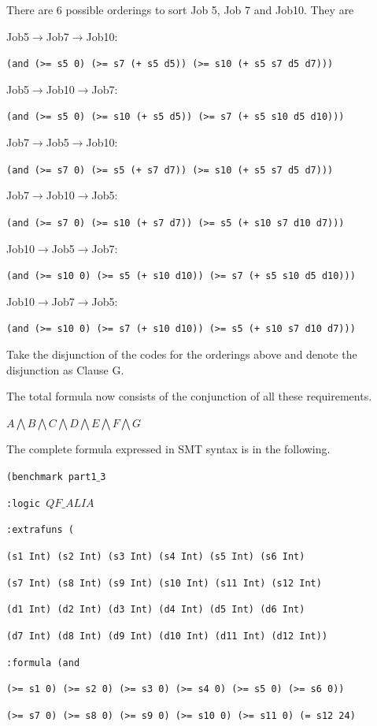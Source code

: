 \documentclass[11pt]{article}
\begin{document}
\begin{description}
  There are 6 possible orderings to sort Job 5, Job 7 and Job10. They are

  Job5$\rightarrow$Job7$\rightarrow$Job10:

  {\tt (and (>= s5 0) (>= s7 (+ s5 d5)) (>= s10 (+ s5 s7 d5 d7)))}

  Job5$\rightarrow$Job10$\rightarrow$Job7:

  {\tt (and (>= s5 0) (>= s10 (+ s5 d5)) (>= s7 (+ s5 s10 d5 d10)))}

  Job7$\rightarrow$Job5$\rightarrow$Job10:

  {\tt (and (>= s7 0) (>= s5 (+ s7 d7)) (>= s10 (+ s5 s7 d5 d7)))}

  Job7$\rightarrow$Job10$\rightarrow$Job5:

  {\tt (and (>= s7 0) (>= s10 (+ s7 d7)) (>= s5 (+ s10 s7 d10 d7)))}

  Job10$\rightarrow$Job5$\rightarrow$Job7:

  {\tt (and (>= s10 0) (>= s5 (+ s10 d10)) (>= s7 (+ s5 s10 d5 d10)))}

  Job10$\rightarrow$Job7$\rightarrow$Job5:

  {\tt (and (>= s10 0) (>= s7 (+ s10 d10)) (>= s5 (+ s10 s7 d10 d7)))}

  Take the disjunction of the codes for the orderings above and denote the disjunction as Clause G.
\end{description}
The total formula now consists of the conjunction of all these requirements.
\begin{center}
$A \bigwedge B \bigwedge C \bigwedge D \bigwedge E \bigwedge F \bigwedge G$
\end{center}
The complete formula expressed in SMT syntax is in the following.

{\tt (benchmark part1$\_$3}

{\tt :logic $QF\_ALIA$}

{\tt :extrafuns (}

{\tt (s1 Int) (s2 Int) (s3 Int) (s4 Int) (s5 Int) (s6 Int)}

{\tt (s7 Int) (s8 Int) (s9 Int) (s10 Int) (s11 Int) (s12 Int)}

{\tt (d1 Int) (d2 Int) (d3 Int) (d4 Int) (d5 Int) (d6 Int)}

{\tt (d7 Int) (d8 Int) (d9 Int) (d10 Int) (d11 Int) (d12 Int))}

{\tt :formula (and}

{\tt (>= s1 0) (>= s2 0) (>= s3 0) (>= s4 0) (>= s5 0) (>= s6 0))}

{\tt (>= s7 0) (>= s8 0) (>= s9 0) (>= s10 0) (>= s11 0) (= s12 24)}
\end{document}
